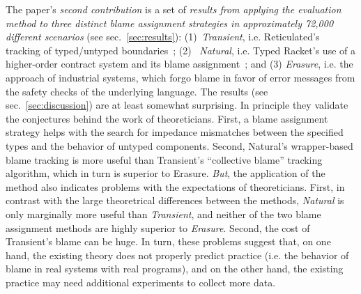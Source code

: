 The paper's {\it second contribution\/} is a set of {\em results from
applying the evaluation method to three distinct blame assignment
strategies in approximately 72,000 different scenarios\/} (see
sec.~\ref{sec:results}): (1)~{\it Transient\/}, i.e. Reticulated's
tracking of typed/untyped boundaries~\citep{vss-popl-2017}; (2)~{\it
Natural\/}, i.e. Typed Racket's use of a higher-order contract system and
its blame assignment~\citep{ff-icfp-2002}; and (3) {\it Erasure\/}, i.e.
the approach of industrial systems, which forgo blame in favor of error
messages from the safety checks of the underlying language. The results
(see sec.~\ref{sec:discussion}) are at least somewhat surprising.  In
principle they validate the conjectures behind the work of theoreticians.
First, a blame assignment strategy helps with the search for
impedance mismatches between the specified types and the behavior of
untyped components.  Second, Natural's wrapper-based blame tracking is
more useful than Transient's ``collective blame'' tracking algorithm,
which in turn is superior to Erasure. {\em But\/}, the application of the
method also indicates problems with the expectations of theoreticians. First,
in contrast with the large theoretrical differences between the methods,
{\it Natural\/} is only marginally more useful than {\it Transient\/}, and neither of the two
blame assignment methods are highly superior to {\it Erasure\/}.  Second,
the cost of Transient's blame can be huge.  In turn, these
problems suggest that, on one hand, the existing theory does not properly
predict practice (i.e. the behavior of blame in real systems with real programs),
and on the other hand, the existing practice may need
additional experiments to collect more data.
